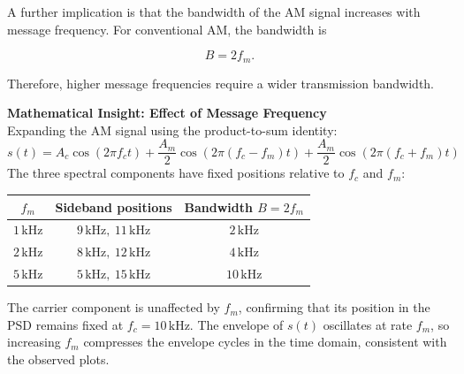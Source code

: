 \documentclass[12pt]{article}
\begin{document}
A further implication is that the bandwidth of the AM signal increases with message frequency. For conventional AM, the bandwidth is

\[
B = 2f_m.
\]

Therefore, higher message frequencies require a wider transmission bandwidth.



\begin{mdframed}[linewidth=1pt]
\textbf{Mathematical Insight: Effect of Message Frequency}\\[6pt]
Expanding the AM signal using the product-to-sum identity:
\[
s(t) = A_c\cos(2\pi f_c t) + \frac{A_m}{2}\cos(2\pi(f_c - f_m)t) + \frac{A_m}{2}\cos(2\pi(f_c + f_m)t)
\]
The three spectral components have fixed positions relative to $f_c$ and $f_m$:
\begin{center}
\begin{tabular}{ccc}
\hline
$f_m$ & Sideband positions & Bandwidth $B = 2f_m$ \\
\hline
$1\,\text{kHz}$ & $9\,\text{kHz},\ 11\,\text{kHz}$ & $2\,\text{kHz}$ \\
$2\,\text{kHz}$ & $8\,\text{kHz},\ 12\,\text{kHz}$ & $4\,\text{kHz}$ \\
$5\,\text{kHz}$ & $5\,\text{kHz},\ 15\,\text{kHz}$ & $10\,\text{kHz}$ \\
\hline
\end{tabular}
\end{center}
The carrier component is unaffected by $f_m$, confirming that its position 
in the PSD remains fixed at $f_c = 10\,\text{kHz}$. The envelope of $s(t)$ 
oscillates at rate $f_m$, so increasing $f_m$ compresses the envelope 
cycles in the time domain, consistent with the observed plots.
\end{mdframed}
\end{document}
